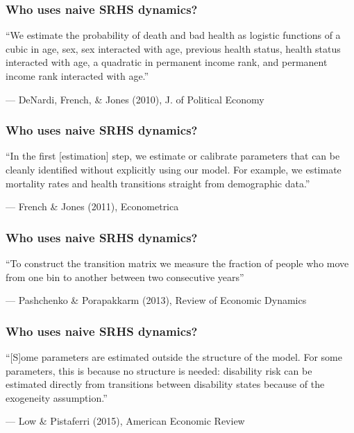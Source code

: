 \documentclass[aspectratio=169]{beamer}
\begin{document}
\begin{frame}\frametitle{Who uses naive SRHS dynamics?}

``We estimate the probability of death and bad health as logistic functions of a cubic in age, sex, sex interacted with age, previous health status, health status interacted with age, a quadratic in permanent income rank, and permanent income rank interacted with age.''
\begin{center}
	--- DeNardi, French, \& Jones (2010), J. of Political Economy
\end{center}
\end{frame}


\begin{frame}\frametitle{Who uses naive SRHS dynamics?}

	``In the first [estimation] step, we estimate or calibrate parameters that can be cleanly identified without explicitly using our model. For example, we estimate mortality rates and health transitions straight from demographic data.''
	
\begin{center}
	--- French \& Jones (2011), Econometrica
\end{center}
\end{frame}


\begin{frame}\frametitle{Who uses naive SRHS dynamics?}

``To construct the transition matrix we measure the fraction of people who move from one bin to another between two consecutive years''

\begin{center}
	--- Pashchenko \& Porapakkarm (2013), Review of Economic Dynamics
\end{center}
\end{frame}


\begin{frame}\frametitle{Who uses naive SRHS dynamics?}

``[S]ome parameters are estimated outside the structure of the model. For some parameters, this is because no structure is needed: disability risk can be estimated directly from transitions between disability states because of the exogeneity assumption.''

\begin{center}
	--- Low \& Pistaferri (2015), American Economic Review
\end{center}
\end{frame}
\end{document}
